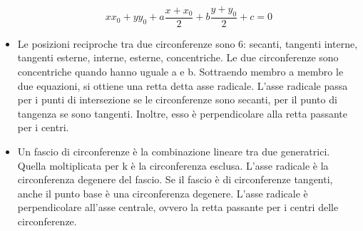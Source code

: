 \documentclass[]{article}
\begin{document}
\begin{itemize}
		$$xx_0+yy_0+a\frac{x+x_0}{2}+b\frac{y+y_0}{2}+c=0$$
	\item Le posizioni reciproche tra due circonferenze sono 6: secanti, tangenti interne, tangenti esterne, interne, esterne, concentriche. Le due circonferenze sono concentriche quando hanno uguale a e b. Sottraendo membro a membro le due equazioni, si ottiene una retta detta asse radicale. L'asse radicale passa per i punti di intersezione se le circonferenze sono secanti, per il punto di tangenza se sono tangenti. Inoltre, esso è perpendicolare alla retta passante per i centri.
	\item Un fascio di circonferenze è la combinazione lineare tra due generatrici. Quella moltiplicata per k è la circonferenza esclusa. L'asse radicale è la circonferenza degenere del fascio. Se il fascio è di circonferenze tangenti, anche il punto base è una circonferenza degenere. L'asse radicale è perpendicolare all'asse centrale, ovvero la retta passante per i centri delle circonferenze.
\end{itemize}
\end{document}
